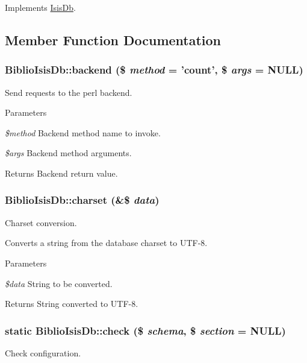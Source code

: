 Implements \hyperlink{interfaceIsisDb_ae1c0a3496d55f710d34c5c19ada7a66b}{IsisDb}.



\subsection{Member Function Documentation}
\hypertarget{classBiblioIsisDb_ad5704f5c9454ac053e66a489797ba221}{
\subsubsection[{backend}]{\setlength{\rightskip}{0pt plus 5cm}BiblioIsisDb::backend (\$ {\em method} = {\ttfamily 'count'}, \/  \$ {\em args} = {\ttfamily NULL})}}
\label{classBiblioIsisDb_ad5704f5c9454ac053e66a489797ba221}
Send requests to the perl backend.


\begin{DoxyParams}{Parameters}
\item[{\em \$method}]Backend method name to invoke.\item[{\em \$args}]Backend method arguments.\end{DoxyParams}
\begin{DoxyReturn}{Returns}
Backend return value. 
\end{DoxyReturn}
\hypertarget{classBiblioIsisDb_a2b6fd7b7316f63ac5649ebf3947c4fae}{
\subsubsection[{charset}]{\setlength{\rightskip}{0pt plus 5cm}BiblioIsisDb::charset (\&\$ {\em data})}}
\label{classBiblioIsisDb_a2b6fd7b7316f63ac5649ebf3947c4fae}
Charset conversion.

Converts a string from the database charset to UTF-\/8.


\begin{DoxyParams}{Parameters}
\item[{\em \$data}]String to be converted.\end{DoxyParams}
\begin{DoxyReturn}{Returns}
String converted to UTF-\/8. 
\end{DoxyReturn}
\hypertarget{classBiblioIsisDb_a929467f1907d3aeaeebe493f0c188c5b}{
\subsubsection[{check}]{\setlength{\rightskip}{0pt plus 5cm}static BiblioIsisDb::check (\$ {\em schema}, \/  \$ {\em section} = {\ttfamily NULL})}}
\label{classBiblioIsisDb_a929467f1907d3aeaeebe493f0c188c5b}
Check configuration.

